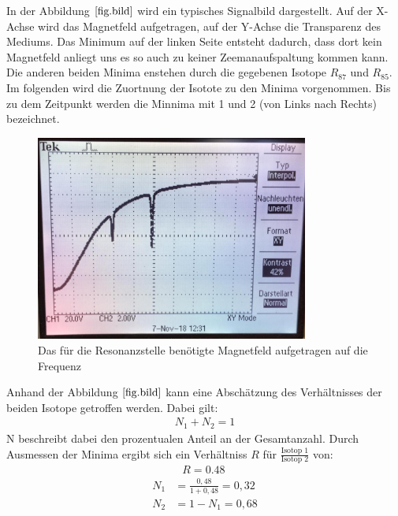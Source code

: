 In der Abbildung $\ref{fig.bild}$ wird ein typisches Signalbild dargestellt.
Auf der X-Achse wird das Magnetfeld aufgetragen, auf der Y-Achse die Transparenz des Mediums.
Das Minimum auf der linken Seite entsteht dadurch, dass dort kein Magnetfeld anliegt uns es so auch zu keiner Zeemanaufspaltung kommen kann.
Die anderen beiden Minima enstehen durch die gegebenen Isotope $R_{87}$ und $R_{85}$.
Im folgenden wird die Zuortnung der Isotote zu den Minima vorgenommen.
Bis zu dem Zeitpunkt werden die Minnima mit 1 und 2 (von Links nach Rechts) bezeichnet.
\begin{figure}[h!]
  \centering
  \includegraphics[width=0.8\textwidth]{bild.jpeg}
  \caption{Das für die Resonanzstelle benötigte Magnetfeld aufgetragen auf die Frequenz}
  \label{fig.bild}
\end{figure}
Anhand der Abbildung $\ref{fig.bild}$ kann eine Abschätzung des Verhältnisses der beiden Isotope getroffen werden.
Dabei gilt:
\begin{align*}
  N_1+N_2 = 1
\end{align*}
N beschreibt dabei den prozentualen Anteil an der Gesamtanzahl.
Durch Ausmessen der Minima ergibt sich ein Verhältniss $R$ für $\frac{\text{Isotop 1}}{\text{Isotop 2}}$ von:
\begin{align*}
  R=\SI{0.48}{}
\end{align*}
\begin{align*}
  N_1&=\frac{0,48}{1+0,48}=0,32\\
  N_2&=1-N_1=0,68
\end{align*}


